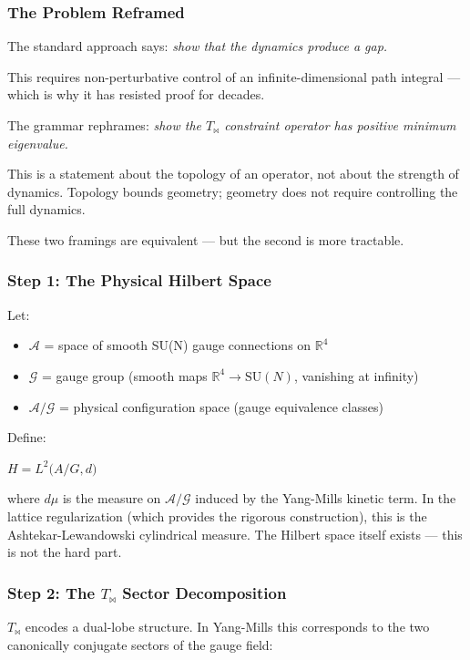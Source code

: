 \documentclass[12pt,a4paper]{article}
\begin{document}
\subsubsection{The Problem Reframed}

The standard approach says: \emph{show that the dynamics produce a gap.}

This requires non-perturbative control of an infinite-dimensional path integral --- which is why it has resisted proof for decades.

The grammar rephrames: \emph{show the $T_{\bowtie}$ constraint operator has positive minimum eigenvalue.}

This is a statement about the topology of an operator, not about the strength of dynamics. Topology bounds geometry; geometry does not require controlling the full dynamics.

These two framings are equivalent --- but the second is more tractable.

\subsubsection{Step 1: The Physical Hilbert Space}

Let:

\begin{itemize}
    \item $\mathcal{A}$ = space of smooth SU(N) gauge connections on $\mathbb{R}^4$
    \item $\mathcal{G}$ = gauge group (smooth maps $\mathbb{R}^4 \to \text{SU}(N)$, vanishing at infinity)
    \item $\mathcal{A}/\mathcal{G}$ = physical configuration space (gauge equivalence classes)
\end{itemize}

Define:

$H  =  L^2(A/G, d$\mu$)$

where $d\mu$ is the measure on $\mathcal{A}/\mathcal{G}$ induced by the Yang-Mills kinetic term. In the lattice regularization (which provides the rigorous construction), this is the Ashtekar-Lewandowski cylindrical measure. The Hilbert space itself exists --- this is not the hard part.

\subsubsection{Step 2: The $T_{\bowtie}$ Sector Decomposition}

$T_{\bowtie}$ encodes a dual-lobe structure. In Yang-Mills this corresponds to the two canonically conjugate sectors of the gauge field:
\end{document}
